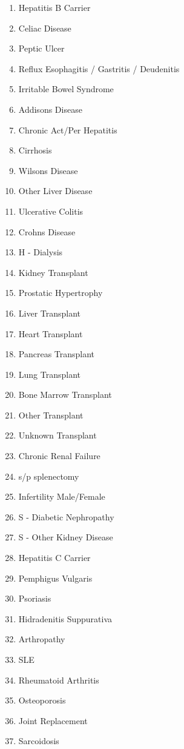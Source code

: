 \documentclass[a4paper,12pt]{article}
\begin{document}
\begin{appendices}
\begin{enumerate}
   			\item Hepatitis B Carrier
   			\item Celiac Disease
   			\item Peptic Ulcer
   			\item Reflux Esophagitis / Gastritis / Deudenitis
   			\item Irritable Bowel Syndrome
   			\item Addisons Disease
   			\item Chronic Act/Per Hepatitis
   			\item Cirrhosis
   			\item Wilsons Disease
   			\item Other Liver Disease
   			\item Ulcerative Colitis
   			\item Crohns Disease
   			\item H - Dialysis
   			\item Kidney Transplant
   			\item Prostatic Hypertrophy
   			\item Liver Transplant
   			\item Heart Transplant
   			\item Pancreas Transplant
   			\item Lung Transplant
   			\item Bone Marrow Transplant
   			\item Other Transplant
   			\item Unknown Transplant
   			\item Chronic Renal Failure
   			\item s/p splenectomy
   			\item Infertility Male/Female
   			\item S - Diabetic Nephropathy
   			\item S - Other Kidney Disease
   			\item Hepatitis C Carrier
   			\item Pemphigus Vulgaris
   			\item Psoriasis
   			\item Hidradenitis Suppurativa
   			\item Arthropathy
   			\item SLE
   			\item Rheumatoid Arthritis
   			\item Osteoporosis
   			\item Joint Replacement
   			\item Sarcoidosis

\end{enumerate}
\end{appendices}
\end{document}
